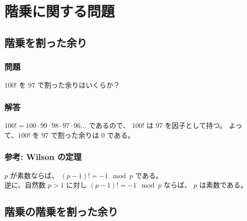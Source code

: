 \section{階乗に関する問題}
\label{s:階乗}

\subsection{階乗を割った余り}
\label{ssec:階乗:階乗を割った余り}
\subsubsection{問題}
\label{sssec:階乗:階乗を割った余り:問題}

$100 !$ を $97$ で割った余りはいくらか？


\clearpage
\subsubsection{解答}
\label{sssec:階乗:階乗を割った余り:解答}

$100 ! = 100 \cdot 99 \cdot 98 \cdot 97 \cdot 96 \ldots$ であるので、
$100!$ は $97$ を因子として持つ。
よって、$100!$ を $97$ で割った余りは 0 である。


\subsubsection{参考: Wilson の定理}
\label{sssec:階乗:階乗を割った余り:参考}

\begin{Theorem}
  $p$ が素数ならば、 $(p-1)! = -1 \mod p$ である。
  \\
  逆に、自然数 $p > 1$ に対し $(p-1)! = -1 \mod p$ ならば、
  $p$ は素数である。
\end{Theorem}
  

\clearpage
\subsection{階乗の階乗を割った余り}
\label{ssec:階乗:階乗の階乗を割った余り}

